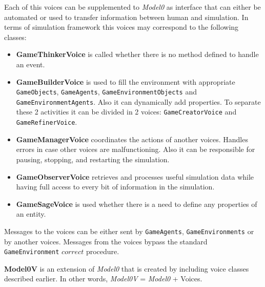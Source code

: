 Each of this voices can be supplemented to \textit{Model0} as interface that can either be automated or used to transfer information between human and simulation. In terms of simulation framework this voices may correspond to the following classes:
\begin{itemize}
\item \textbf{GameThinkerVoice} is called whether there is no method defined to handle an event.
\item \textbf{GameBuilderVoice} is used to fill the environment with appropriate \texttt{GameObjects}, \texttt{GameAgents}, \texttt{GameEnvironmentObjects} and \texttt{GameEnvironmentAgents}. Also it can dynamically add properties. To separate these 2 activities it can be divided in 2 voices: \texttt{GameCreatorVoice} and \texttt{GameRefinerVoice}.
\item \textbf{GameManagerVoice} coordinates the actions of another voices. Handles errors in case other voices are malfunctioning. Also it can be responsible for pausing, stopping, and restarting the simulation.
\item \textbf{GameObserverVoice} retrieves and processes useful simulation data while having full access to every bit of information in the simulation.
\item \textbf{GameSageVoice} is used whether there is a need to define any properties of an entity.
\end{itemize}
Messages to the voices can be either sent by \texttt{GameAgents}, \texttt{GameEnvironments} or by another voices. Messages from the voices bypass the standard \texttt{GameEnvironment} $correct$ procedure.
\begin{definition}
\textbf{Model0V} is an extension of \textit{Model0} that is created by including voice classes described earlier. In other words,
\textit{Model0V} = \textit{Model0}  + Voices.
\end{definition}

